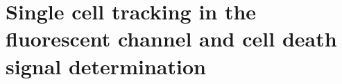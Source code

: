 \documentclass[pdftex,12pt,a4paper]{report}
\begin{document}

\section{Single cell tracking in the fluorescent channel and cell death signal determination}
\label{section:pipeline_fluoroscent}
\end{document}
